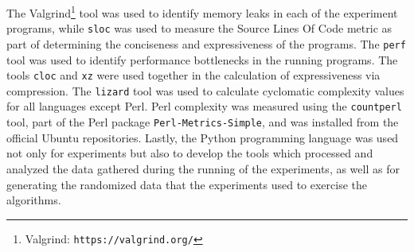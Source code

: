 The Valgrind\footnote{Valgrind: \texttt{https://valgrind.org/}} tool was used to identify memory leaks in each of the experiment programs, while \texttt{sloc} was used to measure the Source Lines Of Code metric as part of determining the conciseness and expressiveness of the programs. The \texttt{perf} tool was used to identify performance bottlenecks in the running programs. The tools \texttt{cloc} and \texttt{xz} were used together in the calculation of expressiveness via compression. The \texttt{lizard} tool was used to calculate cyclomatic complexity values for all languages except Perl. Perl complexity was measured using the \texttt{countperl} tool, part of the Perl package \texttt{Perl-Metrics-Simple}, and was installed from the official Ubuntu repositories. Lastly, the Python programming language was used not only for experiments but also to develop the tools which processed and analyzed the data gathered during the running of the experiments, as well as for generating the randomized data that the experiments used to exercise the algorithms.
